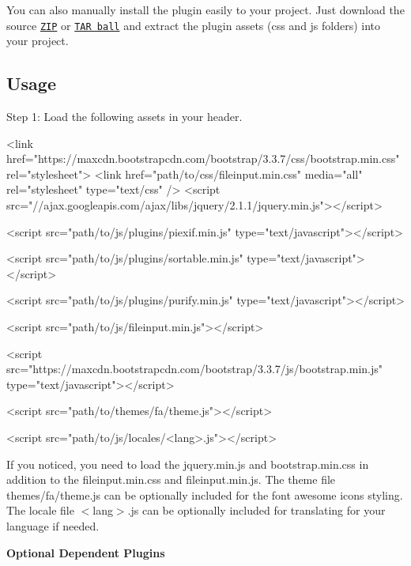 You can also manually install the plugin easily to your project. Just download the source \href{https://github.com/kartik-v/bootstrap-fileinput/zipball/master}{\tt Z\+IP} or \href{https://github.com/kartik-v/bootstrap-fileinput/tarball/master}{\tt T\+AR ball} and extract the plugin assets (css and js folders) into your project.

\subsection*{Usage}

Step 1\+: Load the following assets in your header.


\begin{DoxyCode}
<link href="https://maxcdn.bootstrapcdn.com/bootstrap/3.3.7/css/bootstrap.min.css" rel="stylesheet">
<link href="path/to/css/fileinput.min.css" media="all" rel="stylesheet" type="text/css" />
<script src="//ajax.googleapis.com/ajax/libs/jquery/2.1.1/jquery.min.js"></script>

<script src="path/to/js/plugins/piexif.min.js" type="text/javascript"></script>

<script src="path/to/js/plugins/sortable.min.js" type="text/javascript"></script>

<script src="path/to/js/plugins/purify.min.js" type="text/javascript"></script>

<script src="path/to/js/fileinput.min.js"></script>

<script src="https://maxcdn.bootstrapcdn.com/bootstrap/3.3.7/js/bootstrap.min.js"
       type="text/javascript"></script>

<script src="path/to/themes/fa/theme.js"></script>

<script src="path/to/js/locales/<lang>.js"></script>
\end{DoxyCode}


If you noticed, you need to load the {\ttfamily jquery.\+min.\+js} and {\ttfamily bootstrap.\+min.\+css} in addition to the {\ttfamily fileinput.\+min.\+css} and {\ttfamily fileinput.\+min.\+js}. The theme file {\ttfamily themes/fa/theme.\+js} can be optionally included for the font awesome icons styling. The locale file {\ttfamily $<$lang$>$.js} can be optionally included for translating for your language if needed.

{\bfseries Optional Dependent Plugins}


